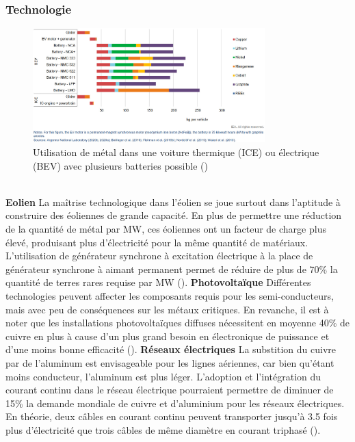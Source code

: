 \subsubsection{Technologie}
\begin{figure}[!b]
    \centering
    \includegraphics[width=0.8\textwidth]{Images/supply_chain/metals_by_battery.jpg}
    \caption{Utilisation de métal dans une voiture thermique (ICE) ou électrique (BEV) avec plusieurs batteries possible (\cite{iea_role_2021})}
    \label{fig:batteries}
\end{figure}
~\\
\textbf{Eolien}
\smallbreak
La maîtrise technologique dans l'éolien se joue surtout dans l'aptitude à construire des éoliennes de grande capacité. En plus de permettre une réduction de la quantité de métal par MW, ces éoliennes ont un facteur de charge plus élevé, produisant plus d'électricité pour la même quantité de matériaux. L'utilisation de générateur synchrone à excitation électrique à la place de générateur synchrone à aimant permanent permet de réduire de plus de 70\% la quantité de terres rares requise par MW (\cite{iea_role_2021}).
\bigbreak
\textbf{Photovoltaïque}
\smallbreak
Différentes technologies peuvent affecter les composants requis pour les semi-conducteurs, mais avec peu de conséquences sur les métaux critiques. En revanche, il est à noter que les installations photovoltaïques diffuses nécessitent en moyenne 40\% de cuivre en plus à cause d'un plus grand besoin en électronique de puissance et d'une moins bonne efficacité (\cite{iea_role_2021}).
\bigbreak
\textbf{Réseaux électriques}\smallbreak
La substition du cuivre par de l'aluminum est envisageable pour les lignes aériennes, car bien qu'étant moins conducteur, l'aluminum est plus léger. L'adoption et l'intégration du courant continu dans le réseau électrique pourraient permettre de diminuer de 15\% la demande mondiale de cuivre et d'aluminium pour les réseaux électriques. En théorie, deux câbles en courant continu peuvent transporter jusqu'à 3.5 fois plus d'électricité que trois câbles de même diamètre en courant triphasé (\cite{iea_role_2021}).
